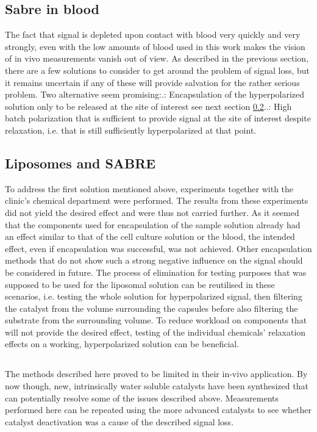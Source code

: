         \subsection{Sabre in blood}
        The fact that signal is depleted upon contact with blood very quickly and very strongly, even with the low amounts of blood used in this work makes the vision of in vivo measurements vanish out of view. As described in the previous section, there are a few solutions to consider to get around the problem of signal loss, but it remains uncertain if any of these will provide salvation for the rather serious problem. Two alternative seem promising:.: Encapsulation of the hyperpolarized solution only to be released at the site of interest see next section \ref{dc:subsec:liposomes}..: High batch polarization that is sufficient to provide signal at the site of interest despite relaxation, i.e. that is still sufficiently hyperpolarized at that point.
        \subsection{Liposomes and SABRE}
        \label{dc:subsec:liposomes}
        To address the first solution mentioned above, experiments together with the clinic's chemical department were performed. The results from these experiments did not yield the desired effect and were thus not carried further. As it seemed that the components used for encapsulation of the sample solution already had an effect similar to that of the cell culture solution or the blood, the intended effect, even if encapsulation was successful, was not achieved. Other encapsulation methods that do not show such a strong negative influence on the signal should be considered in future. The process of elimination for testing purposes that was supposed to be used for the liposomal solution can be reutilised in these scenarios, i.e. testing the whole solution for hyperpolarized signal, then filtering the catalyst from the volume surrounding the capsules before also filtering the substrate from the surrounding volume. To reduce workload on components that will not provide the desired effect, testing of the individual chemicals' relaxation effects on a working, hyperpolarized solution can be beneficial.
        \subsection*{}
        The methods described here proved to be limited in their in-vivo application. By now though, new, intrinsically water soluble catalysts have been synthesized \cite{spannring_new_2016} that can potentially resolve some of the issues described above. Measurements performed here can be repeated using the more advanced catalysts to see whether catalyst deactivation was a cause of the described signal loss.
